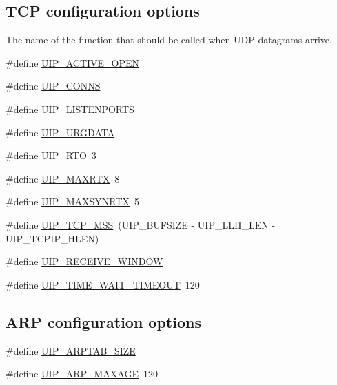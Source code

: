 \subsection*{TCP configuration options}
\label{_amgrp5358ecbda23d45a956b93b22ab223454}
 The name of the function that should be called when UDP datagrams arrive. \begin{DoxyCompactItemize}
\item 
\#define \hyperlink{group__uipopt_gaac0de06236b02659460445de30776e00}{UIP\_\-ACTIVE\_\-OPEN}
\item 
\#define \hyperlink{group__uipopt_gaf5fe83be78b78b9e7d9e7f1e34ab1cc5}{UIP\_\-CONNS}
\item 
\#define \hyperlink{group__uipopt_ga8f4ebd8ef6c0ea665ed351d87fec09fd}{UIP\_\-LISTENPORTS}
\item 
\#define \hyperlink{group__uipopt_ga51c1cd531ff0afb81620151f2248cd21}{UIP\_\-URGDATA}
\item 
\#define \hyperlink{group__uipopt_ga15de27b044603284f68db05a378235a7}{UIP\_\-RTO}~3
\item 
\#define \hyperlink{group__uipopt_ga67cf1e0d2324c93f332c1f020c0fe8b3}{UIP\_\-MAXRTX}~8
\item 
\#define \hyperlink{group__uipopt_ga24aa5bc36939cc9a0833e1df01478a7e}{UIP\_\-MAXSYNRTX}~5
\item 
\#define \hyperlink{group__uipopt_ga4910467b83a639f06739c82cd362037e}{UIP\_\-TCP\_\-MSS}~(UIP\_\-BUFSIZE -\/ UIP\_\-LLH\_\-LEN -\/ UIP\_\-TCPIP\_\-HLEN)
\item 
\#define \hyperlink{group__uipopt_ga5b9dba2123705bce1ce95c3deca0bdad}{UIP\_\-RECEIVE\_\-WINDOW}
\item 
\#define \hyperlink{group__uipopt_ga2bc3b489923793759526a3181eb667fa}{UIP\_\-TIME\_\-WAIT\_\-TIMEOUT}~120
\end{DoxyCompactItemize}
\subsection*{ARP configuration options}
\label{_amgrp106be5433d93df201e2c5e1dd884f385}
 \begin{DoxyCompactItemize}
\item 
\#define \hyperlink{group__uipopt_gab1455b27c06532a399cf06d2c1d6d08d}{UIP\_\-ARPTAB\_\-SIZE}
\item 
\#define \hyperlink{group__uipopt_ga3090117ef3ff5775b77cb1960e442d07}{UIP\_\-ARP\_\-MAXAGE}~120
\end{DoxyCompactItemize}
